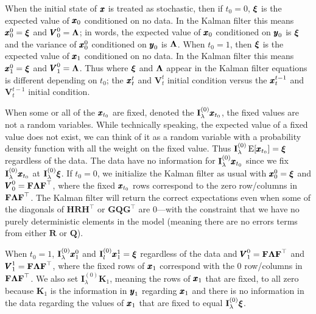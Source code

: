 \documentclass[]{article}
\def\xixi{\mbox{\boldmath $\xi$}}
\def\LAM{\mbox{\boldmath $\Lambda$}}
\def\FF{\mbox{$\mathbf F$}} \def\ff{\mbox{$\mathbf f$}}
\def\GG{\mbox{$\mathbf G$}}	\def\gg{\mbox{$\mathbf g$}}
\def\HH{\mbox{$\mathbf H$}}	\def\hh{\mbox{$\mathbf h$}}
\def\II{\mbox{$\mathbf I$}} \def\ii{\mbox{$\mathbf i$}}
\def\KK{\mbox{$\mathbf K$}}
\def\QQ{\mbox{$\mathbf Q$}}	 \def\qq{\mbox{$\mathbf q$}}
\def\RR{\mbox{$\mathbf R$}}	 \def\rr{\mbox{$\mathbf r$}}
\def\VV{\mbox{$\pmb{V}$}}	\def\vv{\mbox{$\pmb{v}$}}
\def\E{\,\textup{\textrm{E}}}
\begin{document}
When the initial state of $\mbox{$\pmb{x}$}$ is treated as stochastic, then if $t_0=0$,  $\xixi$ is the expected value of $\mbox{$\pmb{x}$}_0$ conditioned on no data.  In the Kalman filter this means $\xx_0^0=\xixi$ and $\VV_0^0=\LAM$; in words, the expected value of $\mbox{$\pmb{x}$}_0$ conditioned on $\mbox{$\pmb{y}$}_0$ is $\xixi$ and the variance of $\mbox{$\pmb{x}$}_0^0$ conditioned on $\mbox{$\pmb{y}$}_0$ is $\LAM$.  When $t_0=1$, then $\xixi$ is the expected value of $\mbox{$\pmb{x}$}_1$ conditioned on no data.  In the Kalman filter this means $\xx_1^0=\xixi$ and $\VV_1^0=\LAM$.  Thus where $\xixi$ and $\LAM$ appear in the Kalman filter equations is different depending on $t_0$; the $\mbox{$\pmb{x}$}_t^t$ and $\VV_t^{t}$ initial condition versus the $\mbox{$\pmb{x}$}_t^{t-1}$ and $\VV_t^{t-1}$ initial condition.

When some or all of the $\mbox{$\pmb{x}$}_{t_0}$ are fixed, denoted the $\II_\lambda^{(0)}\xx_{t_0}$, the fixed values are not a random variables.  While technically speaking, the expected value of a fixed value does not exist, we can think of it as a random variable with a probability density function with all the weight on the fixed value.   Thus $\II_\lambda^{(0)}\E[\xx_{t_0}]=\xixi$ regardless of the data.  The data have no information for $\II_\lambda^{(0)}\xx_{t_0}$ since we fix $\II_\lambda^{(0)}\xx_{t_0}$ at $\II_\lambda^{(0)}\xixi$. If $t_0=0$, we initialize the Kalman filter as usual with $\xx_0^0=\xixi$ and $\VV_0^0=\FF\LAM\FF^\top$, where the fixed $\mbox{$\pmb{x}$}_{t_0}$ rows correspond to the zero row/columns in $\FF\LAM\FF^\top$.  The Kalman filter will return the correct expectations even when some of the diagonals of $\HH\RR\HH^\top$ or $\GG\QQ\GG^\top$ are 0---with the constraint that we have no purely deterministic elements in the model (meaning there are no errors terms from either $\RR$ or $\QQ$).  

When $t_0=1$, $\II_\lambda^{(0)}\xx_1^0$ and $\II_l^{(0)}\xx_1^1=\xixi$ regardless of the data and $\VV_1^0=\FF\LAM\FF^\top$ and $\VV_1^1=\FF\LAM\FF^\top$, where the fixed rows of $\mbox{$\pmb{x}$}_1$ correspond with the 0 row/columns in $\FF\LAM\FF^\top$.  We also set $\II_\lambda^{(0)}\KK_1$, meaning the rows of $\mbox{$\pmb{x}$}_1$ that are fixed, to all zero because $\KK_1$ is the information in $\mbox{$\pmb{y}$}_1$ regarding $\mbox{$\pmb{x}$}_1$ and there is no information in the data regarding the values of $\mbox{$\pmb{x}$}_1$ that are fixed to equal $\II_\lambda^{(0)}\xixi$.  
\end{document}
